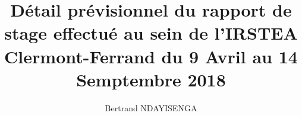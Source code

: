 \documentclass[a4paper,10pt]{report}
\title{Détail prévisionnel du rapport de stage effectué au sein de l'IRSTEA Clermont-Ferrand du 9 Avril au 14 Semptembre 2018}
\author{Bertrand NDAYISENGA}
\begin{document}
\maketitle

\begin{abstract}
\end{abstract}











\end{document}
